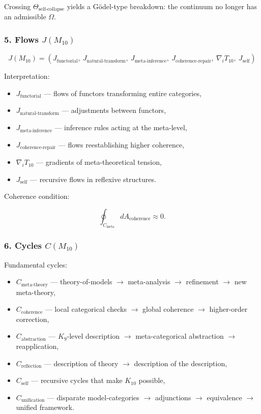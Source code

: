 Crossing $\Theta_{\mathrm{self\mbox{-}collapse}}$ yields a 
Gödel-type breakdown:  
the continuum no longer has an admissible $\Omega$.

\subsubsection*{5. Flows $J(M_{10})$}

\[
J(M_{10}) =
(J_{\mathrm{functorial}},\ 
 J_{\mathrm{natural\mbox{-}transform}},\ 
 J_{\mathrm{meta\mbox{-}inference}},\
 J_{\mathrm{coherence\mbox{-}repair}},\
 \nabla_i T_{10},\
 J_{\mathrm{self}})
\]

Interpretation:

\begin{itemize}
    \item $J_{\mathrm{functorial}}$ — flows of functors transforming entire categories,
    \item $J_{\mathrm{natural\mbox{-}transform}}$ — adjustments between functors,
    \item $J_{\mathrm{meta\mbox{-}inference}}$ — inference rules acting at the meta-level,
    \item $J_{\mathrm{coherence\mbox{-}repair}}$ — flows reestablishing higher coherence,
    \item $\nabla_i T_{10}$ — gradients of meta-theoretical tension,
    \item $J_{\mathrm{self}}$ — recursive flows in reflexive structures.
\end{itemize}

Coherence condition:

\[
\oint_{C_{\mathrm{meta}}} dA_{\mathrm{coherence}} \approx 0.
\]

\subsubsection*{6. Cycles $C(M_{10})$}

Fundamental cycles:

\begin{itemize}
    \item $C_{\mathrm{meta\mbox{-}theory}}$  
        — theory-of-models $\to$ meta-analysis $\to$ refinement $\to$ new meta-theory,
    \item $C_{\mathrm{coherence}}$  
        — local categorical checks $\to$ global coherence $\to$ higher-order correction,
    \item $C_{\mathrm{abstraction}}$  
        — $K_9$-level description $\to$ meta-categorical abstraction $\to$ reapplication,
    \item $C_{\mathrm{reflection}}$  
        — description of theory $\to$ description of the description,
    \item $C_{\mathrm{self}}$  
        — recursive cycles that make $K_{10}$ possible,
    \item $C_{\mathrm{unification}}$  
        — disparate model-categories $\to$ adjunctions $\to$ equivalence $\to$ unified framework.
\end{itemize}

